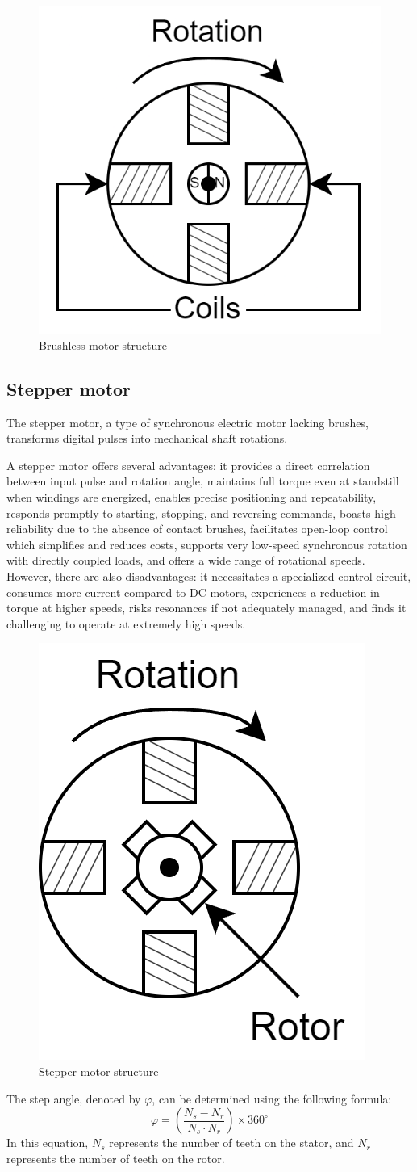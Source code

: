 \begin{figure}[H]
    \centering
    \includegraphics[width=0.25\linewidth]{images/brushless.png}
    \caption{Brushless motor structure}
\end{figure}

\subsection{Stepper motor}
The stepper motor, a type of synchronous electric motor lacking brushes, transforms digital pulses into mechanical shaft rotations.

A stepper motor offers several advantages: it provides a direct correlation between input pulse and rotation angle, maintains full torque even at standstill when windings are energized, enables precise positioning and repeatability, responds promptly to starting, stopping, and reversing commands, boasts high reliability due to the absence of contact brushes, facilitates open-loop control which simplifies and reduces costs, supports very low-speed synchronous rotation with directly coupled loads, and offers a wide range of rotational speeds.
However, there are also disadvantages: it necessitates a specialized control circuit, consumes more current compared to DC motors, experiences a reduction in torque at higher speeds, risks resonances if not adequately managed, and finds it challenging to operate at extremely high speeds.

\begin{figure}[H]
    \centering
    \includegraphics[width=0.2\linewidth]{images/stepper.png}
    \caption{Stepper motor structure}
\end{figure}

The step angle, denoted by $\varphi$, can be determined using the following formula:
\[\varphi =\left(\dfrac{N_s-N_r}{N_s \cdot N_r}\right) \times 360^\circ\]
In this equation, $N_s$ represents the number of teeth on the stator, and $N_r$ represents the number of teeth on the rotor.

